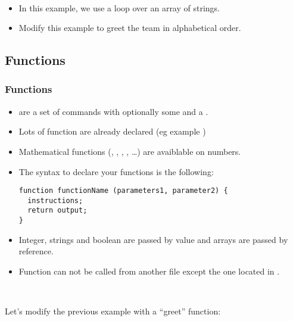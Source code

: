 \begin{frame}
  \begin{example}~\par
    \begin{itemize}
    \item  In this example, we use a loop over an array of strings.
      
    \item Modify this example to greet the team in alphabetical order.
    \end{itemize}
  \end{example}
\end{frame}

\subsection{Functions}
\begin{frame}[fragile]
  \frametitle<presentation>{Functions}
  \begin{itemize}
  \item {} are a set of commands with optionally some
     and a .
  \item Lots of function are already declared (eg example )
  \item Mathematical functions (, , , , \dots) are avaiblable on numbers.
  \item The syntax to declare your  functions is the following:
\begin{verbatim}
function functionName (parameters1, parameter2) {
  instructions;
  return output;
}
\end{verbatim}
  \item Integer, strings and boolean are passed by value and arrays are passed by reference.
  \item Function can not be called from another file
    except the one located in .
  \end{itemize}
\end{frame}

\begin{frame}
  \begin{example}[Function]~\par
    Let's modify the previous example with a ``greet'' function:\par
    
  \end{example}
\end{frame}

